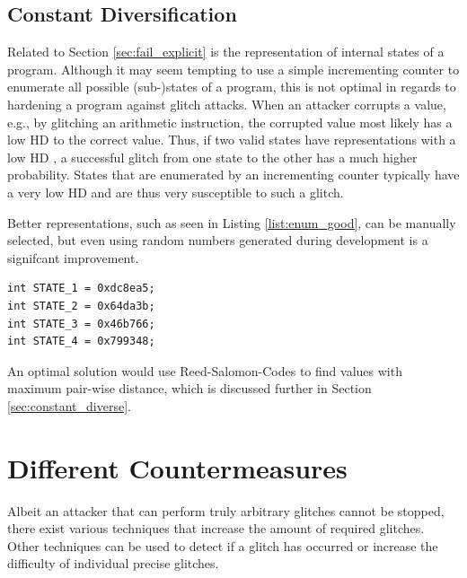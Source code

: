 \section{Constant Diversification}
\label{sec:manual_diverse}
Related to Section \ref{sec:fail_explicit} is the representation of internal states of a program. Although it may seem tempting to use a simple incrementing counter to enumerate all possible (sub-)states of a program, this is not optimal in regards to hardening a program against glitch attacks. When an attacker corrupts a value, e.g., by glitching an arithmetic instruction, the corrupted value most likely has a low HD  to the correct value. Thus, if two valid states have representations with a low HD , a successful glitch from one state to the other has a much higher probability. States that are enumerated by an incrementing counter typically have a very low HD  and are thus very susceptible to such a glitch.\,\cite{witteman2008secure}

Better representations, such as seen in Listing \ref{list:enum_good}, can be manually selected, but even using random numbers generated during development is a signifcant improvement.

\begin{lstlisting}[caption={check-bad},label={list:enum_good}]
int STATE_1 = 0xdc8ea5;
int STATE_2 = 0x64da3b;
int STATE_3 = 0x46b766;
int STATE_4 = 0x799348;
\end{lstlisting}

An optimal solution would use Reed-Salomon-Codes  to find values with maximum pair-wise distance, which is discussed further in Section\,\ref{sec:constant_diverse}.
\chapter{Different Countermeasures}
\label{chap:counter}
Albeit an attacker that can perform truly arbitrary glitches cannot be stopped, there exist various techniques that increase the amount of required glitches. Other techniques  can be used to detect if a glitch has occurred or increase the difficulty of individual precise glitches.

